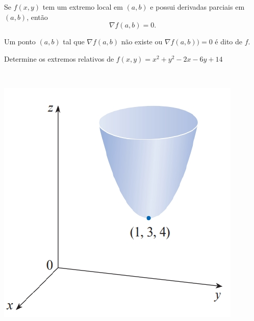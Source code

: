 \begin{frame}[label=otimizacao]

\begin{teo} Se $f(x,y)$ tem um extremo local em $(a,b)$ e possui derivadas parciais em $(a,b)$, então 
\[\nabla f(a,b)=0.\]
\end{teo}

Um ponto $(a,b)$ tal que $\nabla f(a,b)$ não existe ou $\nabla f(a,b))=0$   é dito  de $f$.

\begin{minipage}{0.5\textwidth}
\begin{exe}
Determine os extremos relativos de $f(x,y)=x^2+y^2-2x-6y+14$
\end{exe}
\end{minipage}\ \
\begin{minipage}{0.3\textwidth}
\includegraphics[scale=.4]{figuras/pnt-critico.png}
\end{minipage}

\end{frame}


